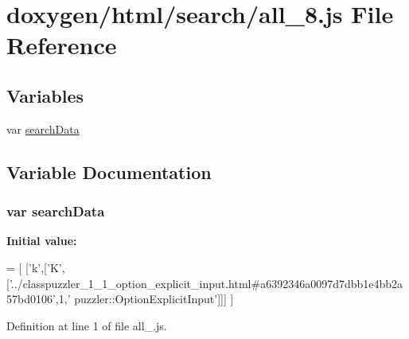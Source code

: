 \hypertarget{a00053}{}\section{doxygen/html/search/all\+\_\+8.js File Reference}
\label{a00053}
\subsection*{Variables}
\begin{DoxyCompactItemize}
\item 
var \hyperlink{a00053_ad01a7523f103d6242ef9b0451861231e}{search\+Data}
\end{DoxyCompactItemize}


\subsection{Variable Documentation}
\hypertarget{a00053_ad01a7523f103d6242ef9b0451861231e}{}
\subsubsection[{search\+Data}]{\setlength{\rightskip}{0pt plus 5cm}var search\+Data}\label{a00053_ad01a7523f103d6242ef9b0451861231e}
{\bfseries Initial value\+:}
\begin{DoxyCode}
=
[
  [\textcolor{charliteral}{'k'},[\textcolor{charliteral}{'K'},[\textcolor{stringliteral}{'../classpuzzler\_1\_1\_option\_explicit\_input.html#a6392346a0097d7dbb1e4bb2a57bd0106'},1,\textcolor{stringliteral}{'
      puzzler::OptionExplicitInput'}]]]
]
\end{DoxyCode}


Definition at line 1 of file all\+\_.\+js.

